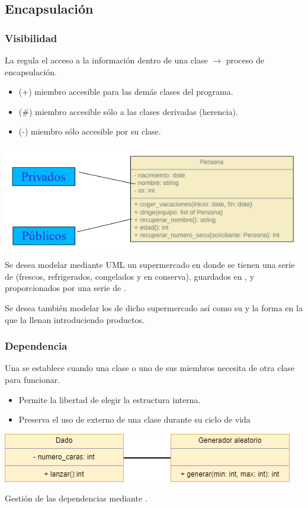 \subsection{Encapsulación}
\subsubsection{Visibilidad}
La  regula el acceso a la información dentro de una clase $\longrightarrow$ proceso de encapsulación.
\begin{itemize}
	\item {} (+) miembro accesible para las demás clases del programa.
	\item {} (\#) miembro accesible sólo a las clases derivadas (herencia).
	\item {} (-) miembro sólo accesible por su clase.
\end{itemize}
\begin{center}
	\includegraphics{"Temas/Tema 2/screenshot002"}
\end{center}
Se desea modelar mediante UML un supermercado en donde se tienen una serie de  (frescos, refrigerados, congelados y en conserva), guardados en , y proporcionados por una serie de .

Se desea también modelar los  de dicho supermercado así como su  y la forma en la que la llenan introduciendo productos.
\subsubsection{Dependencia}
Una  se establece cuando una clase o uno de sus miembros necesita de otra clase para funcionar.
\begin{itemize}
	\item Permite la libertad de elegir la estructura interna.
	\item Preserva el uso de externo de una clase durante su ciclo de vida
\end{itemize}
\begin{center}
	\includegraphics[width=0.5\linewidth]{"Temas/Tema 2/screenshot003.drawio"}
\end{center}
Gestión de las dependencias mediante .